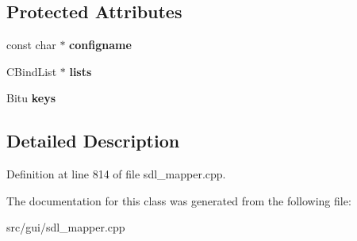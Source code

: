 \subsection*{Protected Attributes}
\begin{DoxyCompactItemize}
\item 
\hypertarget{classCKeyBindGroup_a7202ea1d9a5efdcda4f277d03e63ad63}{const char $\ast$ {\bfseries configname}}\label{classCKeyBindGroup_a7202ea1d9a5efdcda4f277d03e63ad63}

\item 
\hypertarget{classCKeyBindGroup_a915bc22f23540b1f8924adc831ba86ee}{C\-Bind\-List $\ast$ {\bfseries lists}}\label{classCKeyBindGroup_a915bc22f23540b1f8924adc831ba86ee}

\item 
\hypertarget{classCKeyBindGroup_a0d64ae014dfbdc463fea363dccd1bda6}{Bitu {\bfseries keys}}\label{classCKeyBindGroup_a0d64ae014dfbdc463fea363dccd1bda6}

\end{DoxyCompactItemize}


\subsection{Detailed Description}


Definition at line 814 of file sdl\-\_\-mapper.\-cpp.



The documentation for this class was generated from the following file\-:\begin{DoxyCompactItemize}
\item 
src/gui/sdl\-\_\-mapper.\-cpp\end{DoxyCompactItemize}
